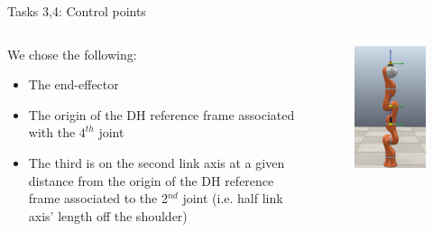 \documentclass[11pt]{beamer}
\begin{document}
\begin{frame}{Tasks 3,4: Control points}
\begin{columns}
\begin{column}{.5\textwidth}
We chose the following:
\begin{itemize}
\item The end-effector
\item The origin of the DH reference frame associated with the $4^{th}$ joint
\item The third is on the second link axis at a given distance from the origin of the DH reference frame associated to the 2$^{nd}$ joint (i.e. half link axis' length off the shoulder)
\end{itemize}
\end{column}
\begin{column}{.5\textwidth}
\begin{figure}[H]
\includegraphics[scale=.25]{./images/KUKA_CPS.png}
\end{figure}
\end{column}
\end{columns}
\end{frame}
\end{document}
